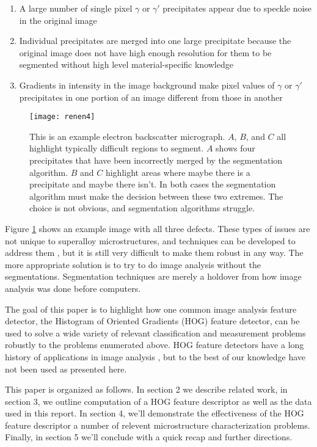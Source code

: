 \documentclass[review]{elsarticle}
\begin{document}
	\begin{enumerate}
		\item \label{prob1} A large number of single pixel $\gamma$ or $\gamma'$ precipitates appear due to speckle noise in the original image
		\item Individual precipitates are merged into one large precipitate because the original image does not have high enough resolution for them to be segmented without high level material-specific knowledge
		\item Gradients in intensity in the image background make pixel values of $\gamma$ or $\gamma'$ precipitates in one portion of an image different from those in another
	\end{enumerate}
	
	\begin{figure}[!ht]
  		\centering
    	\texttt{[image: renen4]}
  		\caption{This is an example electron backscatter micrograph. $A$, $B$, and $C$ all highlight typically difficult regions to segment. $A$ shows four precipitates that have been incorrectly merged by the segmentation algorithm. $B$ and $C$ highlight areas where maybe there is a precipitate and maybe there isn't. In both cases the segmentation algorithm must make the decision between these two extremes. The choice is not obvious, and segmentation algorithms struggle. }
  		\label{figure1}
	\end{figure}

	Figure \ref{figure1} shows an example image with all three defects. These types of issues are not unique to superalloy microstructures, and techniques can be developed to address them \cite{comer, marc1, marc2, marc3}, but it is still very difficult to make them robust in any way. The more appropriate solution is to try to do image analysis without the segmentations. Segmentation techniques are merely a holdover from how image analysis was done before computers.

	The goal of this paper is to highlight how one common image analysis feature detector, the Histogram of Oriented Gradients (HOG) feature detector, can be used to solve a wide variety of relevant classification and measurement problems robustly to the problems enumerated above. HOG feature detectors have a long history of applications in image analysis \cite{gradtex, hog, girsh}, but to the best of our knowledge have not been used as presented here.

	This paper is organized as follows. In section 2 we describe related work, in section 3, we outline computation of a HOG feature descriptor as well as the data used in this report. In section 4, we'll demonstrate the effectiveness of the HOG feature descriptor a number of relevent microstructure characterization problems. Finally, in section 5 we'll conclude with a quick recap and further directions.
	
\end{document}
